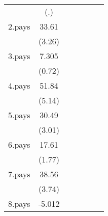 {\begin{tabular}{l*{6}{c}}
                    &         (.)         &                     &                     &                     &                     &                     \\
[1em]
2.pays              &       33.61\sym{**} &                     &                     &                     &                     &                     \\
                    &      (3.26)         &                     &                     &                     &                     &                     \\
[1em]
3.pays              &       7.305         &                     &                     &                     &                     &                     \\
                    &      (0.72)         &                     &                     &                     &                     &                     \\
[1em]
4.pays              &       51.84\sym{***}&                     &                     &                     &                     &                     \\
                    &      (5.14)         &                     &                     &                     &                     &                     \\
[1em]
5.pays              &       30.49\sym{**} &                     &                     &                     &                     &                     \\
                    &      (3.01)         &                     &                     &                     &                     &                     \\
[1em]
6.pays              &       17.61         &                     &                     &                     &                     &                     \\
                    &      (1.77)         &                     &                     &                     &                     &                     \\
[1em]
7.pays              &       38.56\sym{***}&                     &                     &                     &                     &                     \\
                    &      (3.74)         &                     &                     &                     &                     &                     \\
[1em]
8.pays              &      -5.012         &                     &                     &                     &                     &                     \\

\end{tabular}}
